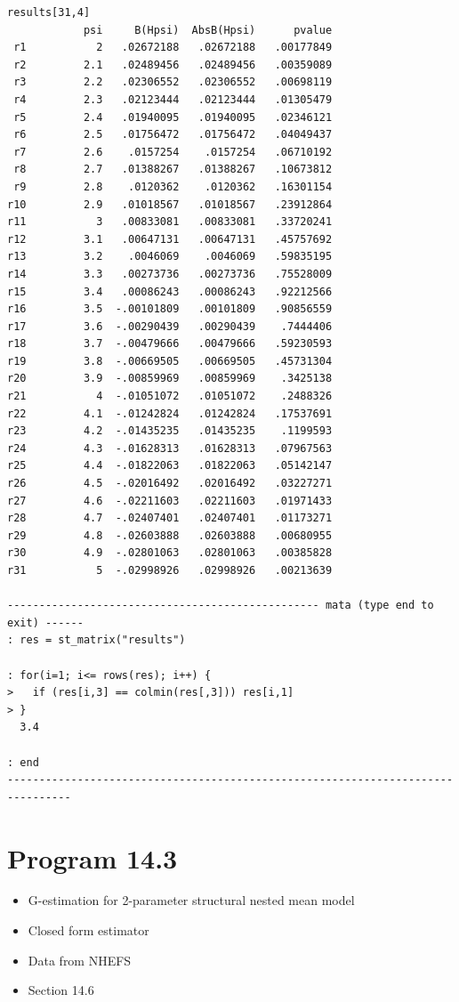 \documentclass[
  10pt,
]{book}
\providecommand{\tightlist}{%
  \setlength{\itemsep}{0pt}\setlength{\parskip}{0pt}}
\begin{document}
\begin{verbatim}
results[31,4]
            psi     B(Hpsi)  AbsB(Hpsi)      pvalue
 r1           2   .02672188   .02672188   .00177849
 r2         2.1   .02489456   .02489456   .00359089
 r3         2.2   .02306552   .02306552   .00698119
 r4         2.3   .02123444   .02123444   .01305479
 r5         2.4   .01940095   .01940095   .02346121
 r6         2.5   .01756472   .01756472   .04049437
 r7         2.6    .0157254    .0157254   .06710192
 r8         2.7   .01388267   .01388267   .10673812
 r9         2.8    .0120362    .0120362   .16301154
r10         2.9   .01018567   .01018567   .23912864
r11           3   .00833081   .00833081   .33720241
r12         3.1   .00647131   .00647131   .45757692
r13         3.2    .0046069    .0046069   .59835195
r14         3.3   .00273736   .00273736   .75528009
r15         3.4   .00086243   .00086243   .92212566
r16         3.5  -.00101809   .00101809   .90856559
r17         3.6  -.00290439   .00290439    .7444406
r18         3.7  -.00479666   .00479666   .59230593
r19         3.8  -.00669505   .00669505   .45731304
r20         3.9  -.00859969   .00859969    .3425138
r21           4  -.01051072   .01051072    .2488326
r22         4.1  -.01242824   .01242824   .17537691
r23         4.2  -.01435235   .01435235    .1199593
r24         4.3  -.01628313   .01628313   .07967563
r25         4.4  -.01822063   .01822063   .05142147
r26         4.5  -.02016492   .02016492   .03227271
r27         4.6  -.02211603   .02211603   .01971433
r28         4.7  -.02407401   .02407401   .01173271
r29         4.8  -.02603888   .02603888   .00680955
r30         4.9  -.02801063   .02801063   .00385828
r31           5  -.02998926   .02998926   .00213639

------------------------------------------------- mata (type end to exit) ------
: res = st_matrix("results")

: for(i=1; i<= rows(res); i++) { 
>   if (res[i,3] == colmin(res[,3])) res[i,1]
> }
  3.4

: end
--------------------------------------------------------------------------------
\end{verbatim}

\hypertarget{program-14.3-1}{%
\section{Program 14.3}\label{program-14.3-1}}

\begin{itemize}
\tightlist
\item
  G-estimation for 2-parameter structural nested mean model
\item
  Closed form estimator
\item
  Data from NHEFS
\item
  Section 14.6
\end{itemize}
\end{document}
